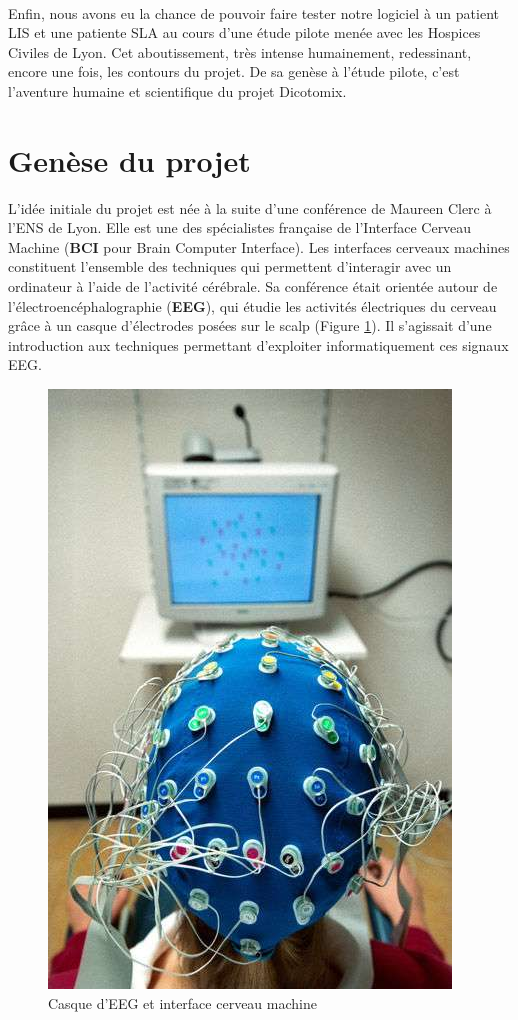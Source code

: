 \documentclass[11pt,a4paper]{article}
\theoremstyle{plain}
\theoremstyle{definition}
\begin{document}
\paragraph{} Enfin, nous avons eu la chance de pouvoir faire tester notre logiciel à un patient LIS et une patiente SLA au cours d'une étude pilote menée avec les Hospices Civiles de Lyon.
Cet aboutissement, très intense humainement, redessinant, encore une fois, les contours du projet.
De sa genèse à l'étude pilote, c'est l'aventure humaine et scientifique du projet Dicotomix.


\section{Genèse du projet}

L'idée initiale du projet est née à la suite d'une conférence de Maureen Clerc à l'ENS de Lyon. Elle est une des spécialistes française de l'Interface Cerveau Machine (\textbf{BCI} pour Brain Computer Interface).
Les interfaces cerveaux machines constituent l'ensemble des techniques qui permettent d'interagir avec un ordinateur à l'aide de l'activité cérébrale. Sa conférence était orientée autour de l'électroencéphalographie (\textbf{EEG}), qui étudie les activités électriques du cerveau grâce à un casque d'électrodes posées sur le scalp (Figure \ref{eeg}). Il s'agissait d'une introduction aux techniques permettant d'exploiter informatiquement ces signaux EEG.

\begin{figure}[ht]
\centering
\includegraphics[scale=0.3]{a66dbabd79_26497_8712-electroencephalogramme-dr.jpg}
\caption{Casque d'EEG et interface cerveau machine}
\label{eeg}
\end{figure}
\end{document}

